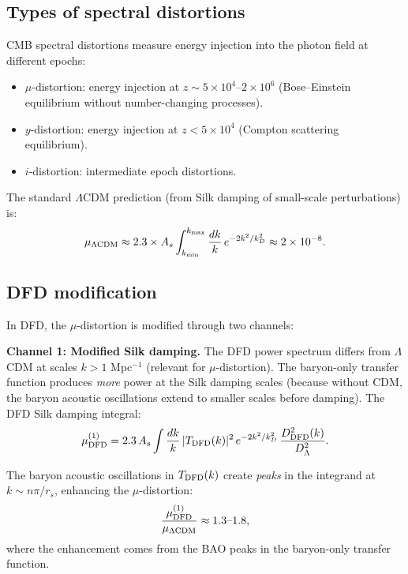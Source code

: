 \documentclass[11pt]{article}
\newcommand{\ee}[1]{\times 10^{#1}}
\begin{document}
\subsection{Types of spectral distortions}

CMB spectral distortions measure energy injection into the photon field at different epochs:
\begin{itemize}
\item $\mu$-distortion: energy injection at $z \sim 5\ee{4}$--$2\ee{6}$ (Bose--Einstein equilibrium without number-changing processes).
\item $y$-distortion: energy injection at $z < 5\ee{4}$ (Compton scattering equilibrium).
\item $i$-distortion: intermediate epoch distortions.
\end{itemize}

The standard $\Lambda$CDM prediction (from Silk damping of small-scale perturbations) is:
\begin{equation}
\mu_{\Lambda\rm CDM} \approx 2.3 \times A_s \int_{k_{\rm min}}^{k_{\rm max}} \frac{dk}{k}\,e^{-2k^2/k_D^2} \approx 2\ee{-8}.
\end{equation}

\subsection{DFD modification}

In DFD, the $\mu$-distortion is modified through two channels:

\textbf{Channel 1: Modified Silk damping.} The DFD power spectrum differs from $\Lambda$CDM at scales $k > 1$ Mpc$^{-1}$ (relevant for $\mu$-distortion). The baryon-only transfer function produces \emph{more} power at the Silk damping scales (because without CDM, the baryon acoustic oscillations extend to smaller scales before damping). The DFD Silk damping integral:
\begin{equation}
\mu_{\rm DFD}^{(1)} = 2.3\,A_s \int \frac{dk}{k}\,|T_{\rm DFD}(k)|^2\,e^{-2k^2/k_D^2}\,\frac{D_{\rm DFD}^2(k)}{D_{\Lambda}^2}.
\end{equation}

The baryon acoustic oscillations in $T_{\rm DFD}(k)$ create \emph{peaks} in the integrand at $k \sim n\pi/r_s$, enhancing the $\mu$-distortion:
\begin{equation}
\frac{\mu_{\rm DFD}^{(1)}}{\mu_{\Lambda\rm CDM}} \approx 1.3\text{--}1.8,
\end{equation}
where the enhancement comes from the BAO peaks in the baryon-only transfer function.
\end{document}

